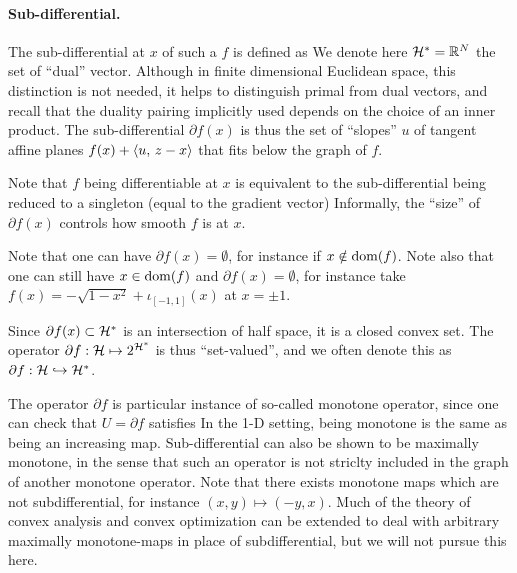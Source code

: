 \paragraph{Sub-differential.}

The sub-differential at $x$ of such a $f$ is defined as
We denote here $\mathcal{H}^* = \mathbb{R}^N$ the set of ``dual'' vector. Although in finite dimensional Euclidean space, this distinction is not needed, it helps to distinguish primal from dual vectors, and recall that the duality pairing implicitly used depends on the choice of an inner product.
%
The sub-differential $\partial f(x)$ is thus the set of ``slopes'' $u$ of tangent affine planes $f(x) + \langle u,\,z-x\rangle$ that fits below the graph of $f$. 


Note that $f$ being differentiable at $x$ is equivalent to the sub-differential being reduced to a singleton (equal to the gradient vector)
Informally, the ``size'' of $\partial f(x)$ controls how smooth $f$ is at $x$.

Note that one can have $\partial f(x) = \emptyset$, for instance if $x \notin \operatorname{dom}(f)$. Note also that one can still have $x \in \operatorname{dom}(f)$ and $\partial f(x) = \emptyset$, for instance take $f(x)=-\sqrt{1-x^2} + \iota_{[-1,1]}(x)$ at $x=\pm 1$. 

Since $\partial f(x) \subset \mathcal{H}^*$ is an intersection of half space, it is a closed convex set.
%
The operator $\partial f : \mathcal{H} \mapsto 2^{\mathcal{H}^*}$ is thus ``set-valued'', and we often denote this as $\partial f : \mathcal{H} \hookrightarrow \mathcal{H}^*$.

\begin{rem}
The operator $\partial f$ is particular instance of so-called monotone operator, since one can check that $U=\partial f$ satisfies 
In the 1-D setting, being monotone is the same as being an increasing map.
%
Sub-differential can also be shown to be maximally monotone, in the sense that such an operator is not striclty included in the graph of another monotone operator. 
%
Note that there exists monotone maps which are not subdifferential, for instance $(x,y) \mapsto (-y,x)$. 
% 
Much of the theory of convex analysis and convex optimization can be extended to deal with arbitrary maximally monotone-maps in place of subdifferential, but we will not pursue this here.
\end{rem}

